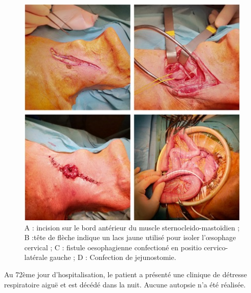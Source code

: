 \documentclass[./tfe]{subfiles}
\begin{document}
\begin{figure}[ht]
    \centering
    \includegraphics[width=\textwidth]{images/chirurgie.jpg}
    \caption{A : incision sur le bord antérieur du muscle sternocleido-mastoïdien ; B :tête de flèche indique un lacs jaune utilisé pour isoler l’œsophage cervical ; C : fistule oesophagienne confectioné en positio cervico-latérale gauche ; D : Confection de jejunostomie.}
    \label{fig:chirurgie}
\end{figure}

Au 72ème jour d’hospitalisation, le patient a présenté une clinique de détresse respiratoire aiguë et est décédé dans la nuit. Aucune autopsie n'a été réalisée.
\end{document}
